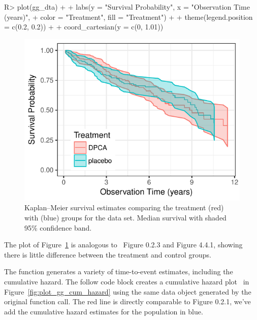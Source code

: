 \documentclass[nojss]{jss}
\begin{document}
\begin{Schunk}
\begin{Sinput}
R> plot(gg_dta) +
+   labs(y = "Survival Probability", x = "Observation Time (years)",
+        color = "Treatment", fill = "Treatment") +
+   theme(legend.position = c(0.2, 0.2)) +
+   coord_cartesian(y = c(0, 1.01))
\end{Sinput}
\begin{figure}[!htb]

{\centering \includegraphics[width=\maxwidth]{fig-rfs/rfs-plot_gg_survival-1} 

}

\caption{Kaplan--Meier survival estimates comparing the  treatment (red) with  (blue) groups for the  data set. Median survival with shaded 95\% confidence band.}\label{fig:plot_gg_survival}
\end{figure}
\end{Schunk}
The  plot of Figure~\ref{fig:plot_gg_survival} is analogous to~\cite{fleming:1991} Figure 0.2.3 and Figure 4.4.1, showing there is little difference between the treatment and control groups.

The  function generates a variety of time-to-event estimates, including the cumulative hazard. The follow code block creates a cumulative hazard plot~\cite[Figure 0.2.1]{fleming:1991} in Figure~\ref{fig:plot_gg_cum_hazard} using the same data object generated by the original  function call. The red  line is directly comparable to Figure 0.2.1, we've add the cumulative hazard estimates for the  population in blue.
\end{document}

